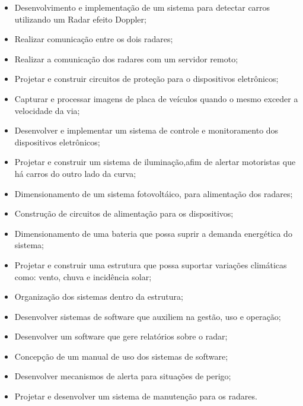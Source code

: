  \begin{itemize}
   \item Desenvolvimento e implementação de um sistema para detectar carros utilizando um Radar efeito Doppler;
   \item Realizar comunicação entre os dois radares;
   \item Realizar a comunicação dos radares com um servidor remoto;
   \item Projetar e construir circuitos de proteção para o dispositivos eletrônicos;
   \item Capturar e processar imagens de placa de veículos quando o mesmo exceder a velocidade da via;
   \item Desenvolver e implementar um sistema de controle e monitoramento dos dispositivos eletrônicos;
   \item Projetar e construir um sistema de iluminação,afim de alertar motoristas que há carros do outro lado da curva;
   \item Dimensionamento de um sistema fotovoltáico, para alimentação dos radares;
   \item Construção de circuitos de alimentação para os dispositivos;
   \item Dimensionamento de uma bateria que possa suprir a demanda energética do sistema;
   \item Projetar e construir uma estrutura que possa suportar variações climáticas como: vento, chuva e incidência solar;
   \item Organização dos sistemas dentro da estrutura;
   \item Desenvolver sistemas de software que auxiliem na gestão, uso e operação;
   \item Desenvolver um software que gere relatórios sobre o radar;
   \item Concepção de um manual de uso dos sistemas de software;
   \item Desenvolver mecanismos de alerta para situações de perigo;
   \item Projetar e desenvolver um sistema de manutenção para os radares.
   
 \end{itemize}